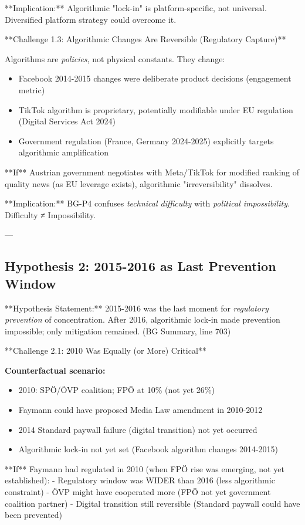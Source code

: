 **Implication:** Algorithmic "lock-in" is platform-specific, not universal. Diversified platform strategy could overcome it.

**Challenge 1.3: Algorithmic Changes Are Reversible (Regulatory Capture)**

Algorithms are \textit{policies}, not physical constants. They change:
\begin{itemize}
\item Facebook 2014-2015 changes were deliberate product decisions (engagement metric)
\item TikTok algorithm is proprietary, potentially modifiable under EU regulation (Digital Services Act 2024)
\item Government regulation (France, Germany 2024-2025) explicitly targets algorithmic amplification
\end{itemize}

**If** Austrian government negotiates with Meta/TikTok for modified ranking of quality news (as EU leverage exists), algorithmic "irreversibility" dissolves.

**Implication:** BG-P4 confuses \textit{technical difficulty} with \textit{political impossibility}. Difficulty ≠ Impossibility.

---

\subsection*{Hypothesis 2: 2015-2016 as Last Prevention Window}

**Hypothesis Statement:** 2015-2016 was the last moment for \textit{regulatory prevention} of concentration. After 2016, algorithmic lock-in made prevention impossible; only mitigation remained. (BG Summary, line 703)

**Challenge 2.1: 2010 Was Equally (or More) Critical**

\textbf{Counterfactual scenario:}
\begin{itemize}
\item 2010: SPÖ/ÖVP coalition; FPÖ at 10\% (not yet 26\%)
\item Faymann could have proposed Media Law amendment in 2010-2012
\item 2014 Standard paywall failure (digital transition) not yet occurred
\item Algorithmic lock-in not yet set (Facebook algorithm changes 2014-2015)
\end{itemize}

**If** Faymann had regulated in 2010 (when FPÖ rise was emerging, not yet established):
- Regulatory window was WIDER than 2016 (less algorithmic constraint)
- ÖVP might have cooperated more (FPÖ not yet government coalition partner)
- Digital transition still reversible (Standard paywall could have been prevented)


